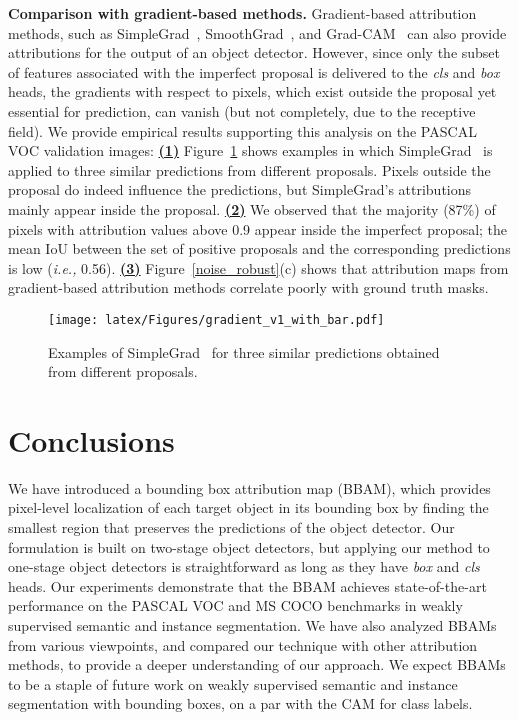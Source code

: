 \documentclass[final]{cvpr}
\begin{document}
\textbf{Comparison with gradient-based methods.}
Gradient-based attribution methods, such as SimpleGrad~\cite{zeiler2014visualizing}, SmoothGrad~\cite{smilkov2017smoothgrad}, and Grad-CAM~\cite{selvaraju2017grad} can also provide attributions for the output of an object detector. 
However, since only the subset of features associated with the imperfect proposal is delivered to the \textit{cls} and \textit{box} heads, the gradients with respect to pixels, which exist outside the proposal yet essential for prediction, can vanish (but not completely, due to the receptive field). 
We provide empirical results supporting this analysis on the PASCAL VOC validation images: \underline{\textbf{(1)}} Figure~\ref{gradient_ex} shows examples in which SimpleGrad~\cite{zeiler2014visualizing} is applied to three similar predictions from different proposals. Pixels outside the proposal do indeed influence the predictions, but SimpleGrad's attributions mainly appear inside the proposal. 
\underline{\textbf{(2)}} We observed that the majority (87\%) of pixels with attribution values above 0.9 appear inside the imperfect proposal; the mean IoU between the set of positive proposals and the corresponding predictions is low (\textit{i.e.,} 0.56).
\underline{\textbf{(3)}} Figure~\ref{noise_robust}(c) shows that attribution maps from gradient-based attribution methods correlate poorly with ground truth masks.

\begin{figure}[t]
\centering
\texttt{[image: latex/Figures/gradient\_v1\_with\_bar.pdf]}
\vspace{-1.5em}
\caption{\label{gradient_ex} Examples of SimpleGrad~\cite{zeiler2014visualizing} for three similar predictions obtained from different proposals.}
\vspace{-1em}
\end{figure} 


\vspace{-0.15em}
\section{Conclusions}
\vspace{-0.15em}
We have introduced a bounding box attribution map (BBAM), which provides pixel-level localization of each target object in its bounding box by finding the smallest region that preserves the predictions of the object detector.
Our formulation is built on two-stage object detectors, but applying our method to one-stage object detectors is straightforward as long as they have \textit{box} and \textit{cls} heads.
Our experiments demonstrate that the BBAM achieves state-of-the-art performance on the PASCAL VOC and MS COCO benchmarks in weakly supervised semantic and instance segmentation.
We have also analyzed BBAMs from various viewpoints, and compared our technique with other attribution methods, to provide a deeper understanding of our approach.
We expect BBAMs to be a staple of future work on weakly supervised semantic and instance segmentation with bounding boxes, on a par with the CAM for class labels.  
\end{document}
